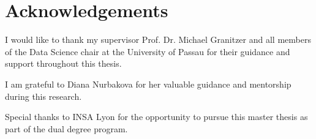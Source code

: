 \chapter*{Acknowledgements}
I would like to thank my supervisor Prof. Dr. Michael Granitzer and all members of the Data Science chair at the University of Passau for their guidance and support throughout this thesis.

I am grateful to Diana Nurbakova for her valuable guidance and mentorship during this research.

Special thanks to INSA Lyon for the opportunity to pursue this master thesis as part of the dual degree program.


